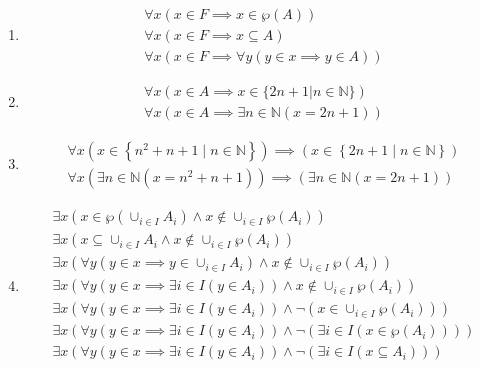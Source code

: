 \begin{solution}
    \begin{enumerate}[label=(\alph*)]
    \item {
        \begin{align*}
        \forall x (x \in F \implies x \in \wp(A)) \\
        \forall x (x \in F \implies x \subseteq A) \\
        \forall x (x \in F \implies \forall y (y \in x \implies y \in A))
        \end{align*}
    }

    \item {
        \begin{align*}
        \forall x (x \in A \implies x \in \{2n + 1 | n \in \mathbb{N}\}) \\
        \forall x (x \in A \implies \exists n \in \mathbb{N} (x=2n+1))
        \end{align*}
    }
    \item {
        \begin{align*}
        \forall x (x \in \left\{n^2 + n + 1 \mid n \in \mathbb{N} \right\}) \implies (x \in \left\{2n + 1 \mid n \in \mathbb{N} \right\}) \\
        \forall x (\exists n \in \mathbb{N} (x = n^2 + n + 1)) \implies (\exists n \in \mathbb{N} (x=2n+1))
        \end{align*}
    }
    \item {
        \begin{align*}
        \exists x(x \in \wp(\cup_{i \in I} A_i) \land x \notin \cup_{i \in I} \wp(A_i)) \\
        \exists x(x \subseteq \cup_{i \in I} A_i \land x \notin \cup_{i \in I} \wp(A_i)) \\
        \exists x( \forall y (y \in x \implies y \in \cup_{i \in I} A_i) \land
        x \notin \cup_{i \in I} \wp(A_i)) \\
        \exists x( \forall y (y \in x \implies \exists i \in I(y \in A_i))
        \land x \notin \cup_{i \in I} \wp(A_i)) \\
        \exists x( \forall y (y \in x \implies \exists i \in I(y \in A_i))
        \land \neg (x \in \cup_{i \in I} \wp(A_i))) \\
        \exists x( \forall y (y \in x \implies \exists i \in I(y \in A_i))
        \land \neg (\exists i \in I(x \in \wp(A_i)))) \\
        \exists x( \forall y (y \in x \implies \exists i \in I(y \in A_i))
        \land \neg (\exists i \in I(x \subseteq A_i))) \\

\end{align*}}
\end{enumerate}
\end{solution}
